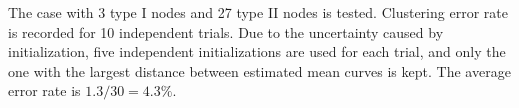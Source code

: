 The case with 3 type I nodes and 27 type II nodes is tested.
Clustering error rate is recorded for 10 independent trials. 
Due to the uncertainty caused by initialization, five independent initializations are used for each trial, and only the one with the largest distance between estimated mean curves is kept.
The average error rate is $1.3/30=4.3\%$.





